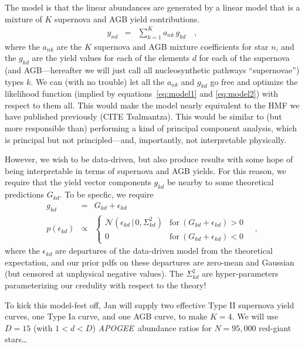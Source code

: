 \documentclass[12pt, preprint]{aastex}
\newcommand{\equationname}{equation}
\newcommand{\acronym}[1]{{\small{#1}}}
\newcommand{\project}[1]{\textsl{#1}}
\newcommand{\apogee}{\project{\acronym{APOGEE}}}
\newcommand{\given}{\,|\,}
\newcommand{\normal}{\mathcal{N}}
\begin{document}
The model is that the linear abundances are generated by a linear model
that is a mixture of $K$ supernova and AGB yield contributions.
\begin{eqnarray}
  y_{nd} &=& \sum_{k=1}^K a_{nk}\,g_{kd}
\quad ,
\end{eqnarray}
where the $a_{nk}$ are the $K$ supernova and AGB mixture coefficients
for star $n$, and the $g_{kd}$ are the yield values for each of the
elements $d$ for each of the supernova (and AGB---hereafter we will
just call all nucleosynthetic pathways ``supernovae'') types $k$.
We can (with no trouble) let all the $a_{nk}$ and $g_{kd}$ go free and
optimize the likelihood function (implied by
\equationname s~\ref{eq:model1} and \ref{eq:model2}) with respect to them all.
This would make the model nearly equivalent to the HMF we have published
previously (CITE Tsalmantza).
This would be similar to (but more responsible than) performing a kind
of principal component analysis, which is principal but not
principled---and, importantly, not interpretable physically.

However, we wish to be data-driven, but also produce results with some
hope of being interpretable in terms of supernova and AGB yields.
For this reason, we require that the yield vector components $g_{kd}$
be nearby to some theoretical predictions $G_{kd}$.
To be specfic, we require
\begin{eqnarray}
  g_{kd} &=& G_{kd} + \epsilon_{kd}
\\
  p(\epsilon_{kd}) &\propto& \left\{\begin{array}{rr}
  \normal(\epsilon_{kd}\given 0,\Sigma^2_{kd}) & \mbox{for}~(G_{kd}+\epsilon_{kd})>0 \\
                                             0 & \mbox{for}~(G_{kd}+\epsilon_{kd})<0 \end{array}\right.
\quad ,
\end{eqnarray}
where the $\epsilon_{kd}$ are departures of the data-driven model from
the theoretical expectation, and our prior pdfs on these departures
are zero-mean and Gaussian (but censored at unphysical negative values).
The $\Sigma^2_{kd}$ are hyper-parameters parameterizing our credulity
with respect to the theory!

To kick this model-fest off, Jan will supply two effective Type II
supernova yield curves, one Type Ia curve, and one AGB curve, to make
$K=4$.  We will use $D=15$ (with $1<d<D$) \apogee\ abundance ratios
for $N=95,000$ red-giant stars\ldots
\end{document}
